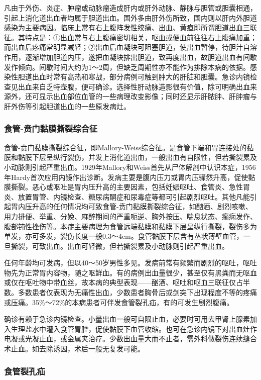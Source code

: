 凡由于外伤、炎症、肿瘤或动脉瘤造成肝内或肝外动脉、静脉与胆管或胆囊相通，引起上消化道出血者均属于胆道出血。国外多由肝外伤所致，国内则以肝内外胆道感染为主要病因。临床上常有右上腹阵发性绞痛、出血、黄疸即所谓胆道出血三联征。其特点是：①出血常与右上腹痛密切相关，呕血或便血前往往右上腹痛加重；而出血后疼痛常明显减轻；②出血后血凝块可阻塞胆道，使出血暂停，待胆汁自溶作用，逐渐增加胆道内压，遂把血凝块排出胆道，致再度出血，故胆道出血有间歇发作倾向。间歇时间大约为1～2周，但缺乏周期性亦不能作为排除本病的依据。感染性胆道出血时常有高热和寒战，部分病例可触到肿大的肝脏和胆囊。急诊内镜检查见出血来自乏特壶腹，便可确诊。选择性肝动脉造影很有价值，除可明确出血来源外，还可显示出血部位血管的一些病理改变影像；同时还显示肝脓肿、肝肿瘤与肝外伤等引起胆道出血的一些原发病灶。

\subsubsection{食管-贲门黏膜撕裂综合征}

食管-贲门黏膜撕裂综合征，即Mallory-Weiss综合征。是食管下端和胃连接处的黏膜和黏膜下层呈纵行裂伤，并发上消化道出血，一般出血有自限性，但若撕裂累及小动脉则引起严重出血。1929年Mallory和Weiss首先从尸体解剖中认识本症，1956年Hardy首次应用内镜作出诊断。发病主要是腹内压力或胃内压骤然升高，促使黏膜撕裂。恶心或呕吐是胃内压升高的主要因素，包括妊娠呕吐、食管炎、急性胃炎、放置胃管、内镜检查、糖尿病酮症和尿毒症等都可引起剧烈呕吐。其他凡能引起胃内压升高的任何情况均可致食管-贲门黏膜撕裂综合征，如酗酒、剧烈咳嗽、用力排便、举重、分娩、麻醉期间的严重呃逆、胸外按压、喘息状态、癫痫发作、腹部钝性挫伤等。本症主要病理为食管远端黏膜和黏膜下层呈纵行撕裂，裂伤多为单发，亦可多发，裂伤长度一般0.3～4cm。食管黏膜下层含有丛状薄壁血管，一旦撕裂，可致出血。出血可轻微，但若撕裂累及小动脉则引起严重出血。

任何年龄均可发病，但以40～50岁男性多见。发病前常有频繁而剧烈的呕吐，呕吐物先为正常胃内容物，随之呕鲜血。有的病例出血量很少，甚至仅有黑粪而无呕血或仅在呕吐物中带血丝，故本病的典型表现------酗酒、呕吐和呕血三联征仅占半数。多数患者仅表现为无痛性出血，少数患者胸骨后或剑突下出现程度不等的疼痛或压痛。35\%～72\%的本病患者可伴发食管裂孔疝，有的可发生剧烈腹痛。

确诊有赖于急诊内镜检查。小量出血一般可自限止血，必要时可用去甲肾上腺素加入生理盐水中灌入食管胃腔，促使黏膜下血管收缩。也可在急诊内镜下对出血灶作电凝或光凝止血，或金属夹治疗。少数出血量大而不止者，需外科做裂伤连续缝合术止血。如去除诱因，术后一般无复发可能。

\subsubsection{食管裂孔疝}

